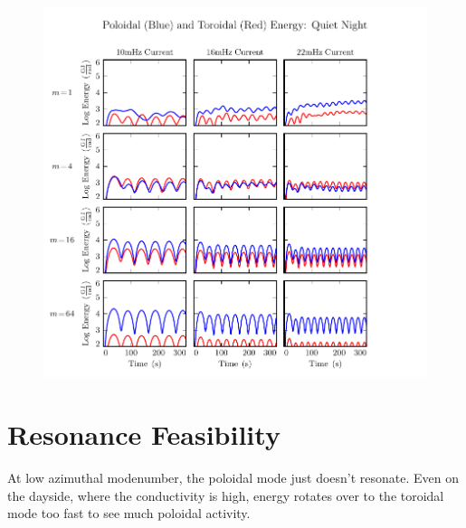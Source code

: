 \begin{figure}[H]
    \centering
    \includegraphics[width=\textwidth]{figures/UP_UT_J_4.pdf}
    \caption[Current-Driven Poloidal and Toroidal Energy: Quiet Night]{}
    \label{fig_UP_UT_J_4}
\end{figure}

\section{Resonance Feasibility}

At low azimuthal modenumber, the poloidal mode just doesn't resonate. Even on the dayside, where the conductivity is high, energy rotates over to the toroidal mode too fast to see much poloidal activity. 

